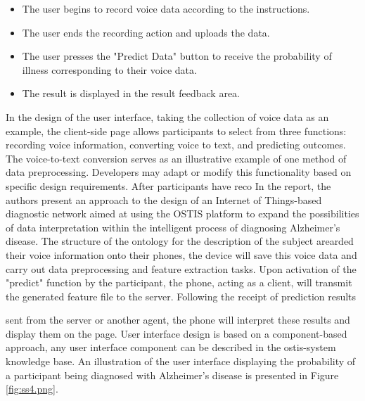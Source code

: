 \documentclass[10pt, a4paper]{article}
\begin{document}
\begin{SCn}
\begin{small}
\begin{multicols}{2}
\begin{itemize}
\vspace{-0.2cm}
\item The user begins to record voice data according to
the instructions.
\vspace{-0.2cm}
\item The user ends the recording action and uploads the
data.
\vspace{-0.2cm}
\item The user presses the "Predict Data" button to receive
the probability of illness corresponding to their
voice data.
\vspace{-0.2cm}
\item The result is displayed in the result feedback area.
\end{itemize}
\indent
In the design of the user interface, taking the collection
of voice data as an example, the client-side page allows
participants to select from three functions: recording
voice information, converting voice to text, and predicting outcomes. The voice-to-text conversion serves as an
illustrative example of one method of data preprocessing.
Developers may adapt or modify this functionality based
on specific design requirements. After participants have
reco
In the report, the authors present an approach to
the design of an Internet of Things-based diagnostic
network aimed at using the OSTIS platform to expand the
possibilities of data interpretation within the intelligent
process of diagnosing Alzheimer’s disease. The structure
of the ontology for the description of the subject arearded their voice information onto their phones, the
device will save this voice data and carry out data preprocessing and feature extraction tasks. Upon activation
of the "predict" function by the participant, the phone,
acting as a client, will transmit the generated feature file
to the server. Following the receipt of prediction results
\end{multicols}
\newpage
\begin{multicols}{2}
\noindent  
sent from the server or another agent, the phone will
interpret these results and display them on the page.
User interface design is based on a component-based
approach, any user interface component can be described
in the ostis-system knowledge base. An illustration of the
user interface displaying the probability of a participant
being diagnosed with Alzheimer’s disease is presented
in Figure \ref{fig:ss4.png}.\\
\vspace{-0.2cm}
\setcounter{figure}{4}
\begin{figure}[H]

\end{figure}
\end{multicols}
\end{small}
\end{SCn}
\end{document}
